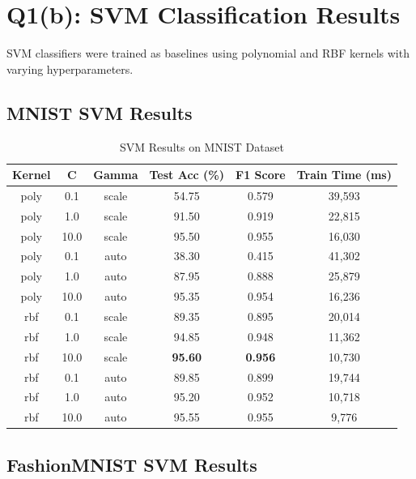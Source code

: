 \documentclass[11pt,a4paper]{article}
\begin{document}
\section{Q1(b): SVM Classification Results}

SVM classifiers were trained as baselines using polynomial and RBF kernels with varying hyperparameters.

\subsection{MNIST SVM Results}

\begin{table}[H]
\centering
\caption{SVM Results on MNIST Dataset}
\begin{tabular}{|c|c|c|c|c|c|}
\hline
\textbf{Kernel} & \textbf{C} & \textbf{Gamma} & \textbf{Test Acc (\%)} & \textbf{F1 Score} & \textbf{Train Time (ms)} \\
\hline
poly & 0.1 & scale & 54.75 & 0.579 & 39,593 \\
\hline
poly & 1.0 & scale & 91.50 & 0.919 & 22,815 \\
\hline
poly & 10.0 & scale & 95.50 & 0.955 & 16,030 \\
\hline
poly & 0.1 & auto & 38.30 & 0.415 & 41,302 \\
\hline
poly & 1.0 & auto & 87.95 & 0.888 & 25,879 \\
\hline
poly & 10.0 & auto & 95.35 & 0.954 & 16,236 \\
\hline
rbf & 0.1 & scale & 89.35 & 0.895 & 20,014 \\
\hline
rbf & 1.0 & scale & 94.85 & 0.948 & 11,362 \\
\hline
rbf & 10.0 & scale & \textbf{95.60} & \textbf{0.956} & 10,730 \\
\hline
rbf & 0.1 & auto & 89.85 & 0.899 & 19,744 \\
\hline
rbf & 1.0 & auto & 95.20 & 0.952 & 10,718 \\
\hline
rbf & 10.0 & auto & 95.55 & 0.955 & 9,776 \\
\hline
\end{tabular}
\end{table}

\subsection{FashionMNIST SVM Results}
\end{document}
